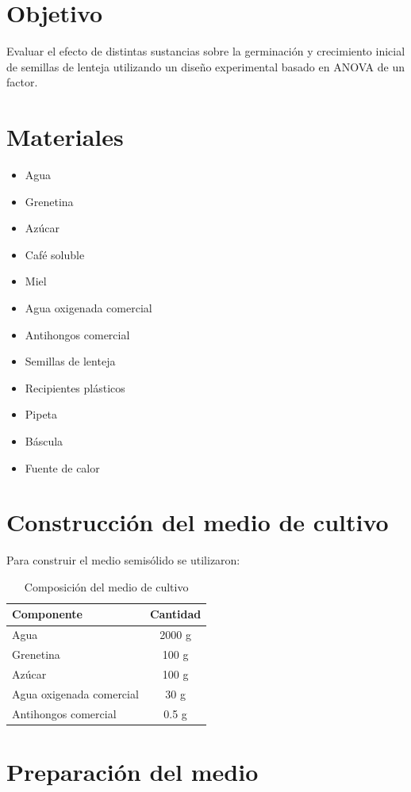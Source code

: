 \documentclass[compacto,10pt,comentarios]{aleph-notas}
\begin{document}
\section{Objetivo}

Evaluar el efecto de distintas sustancias sobre la germinación y crecimiento inicial de semillas de lenteja utilizando un diseño experimental basado en ANOVA de un factor.

\section{Materiales}

\begin{itemize}
\item Agua
\item Grenetina
\item Azúcar
\item Café soluble
\item Miel
\item Agua oxigenada comercial
\item Antihongos comercial
\item Semillas de lenteja
\item Recipientes plásticos
\item Pipeta
\item Báscula
\item Fuente de calor
\end{itemize}

\section{Construcción del medio de cultivo}

Para construir el medio semisólido se utilizaron:

\begin{table}[H]
\centering
\begin{tabular}{lc}
\toprule
Componente & Cantidad \\
\midrule
Agua & 2000 g \\
Grenetina & 100 g \\
Azúcar & 100 g \\
Agua oxigenada comercial & 30 g \\
Antihongos comercial & 0.5 g \\
\bottomrule
\end{tabular}
\caption{Composición del medio de cultivo}
\end{table}

\section{Preparación del medio}
\end{document}

